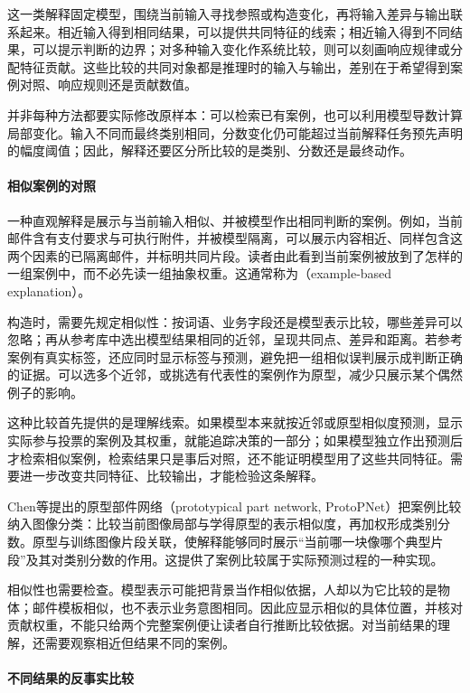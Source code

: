 这一类解释固定模型，围绕当前输入寻找参照或构造变化，再将输入差异与输出联系起来。相近输入得到相同结果，可以提供共同特征的线索；相近输入得到不同结果，可以提示判断的边界；对多种输入变化作系统比较，则可以刻画响应规律或分配特征贡献。这些比较的共同对象都是推理时的输入与输出，差别在于希望得到案例对照、响应规则还是贡献数值。

并非每种方法都要实际修改原样本：可以检索已有案例，也可以利用模型导数计算局部变化。输入不同而最终类别相同，分数变化仍可能超过当前解释任务预先声明的幅度阈值；因此，解释还要区分所比较的是类别、分数还是最终动作。

\paragraph{相似案例的对照}
\label{sec:interpretability-local-examples}

一种直观解释是展示与当前输入相似、并被模型作出相同判断的案例。例如，当前邮件含有支付要求与可执行附件，并被模型隔离，可以展示内容相近、同样包含这两个因素的已隔离邮件，并标明共同片段。读者由此看到当前案例被放到了怎样的一组案例中，而不必先读一组抽象权重。这通常称为（example-based explanation）。

构造时，需要先规定相似性：按词语、业务字段还是模型表示比较，哪些差异可以忽略；再从参考库中选出模型结果相同的近邻，呈现共同点、差异和距离。若参考案例有真实标签，还应同时显示标签与预测，避免把一组相似误判展示成判断正确的证据。可以选多个近邻，或挑选有代表性的案例作为原型，减少只展示某个偶然例子的影响。

这种比较首先提供的是理解线索。如果模型本来就按近邻或原型相似度预测，显示实际参与投票的案例及其权重，就能追踪决策的一部分；如果模型独立作出预测后才检索相似案例，检索结果只是事后对照，还不能证明模型用了这些共同特征。需要进一步改变共同特征、比较输出，才能检验这条解释。

Chen等提出的原型部件网络（prototypical part network, ProtoPNet）把案例比较纳入图像分类：比较当前图像局部与学得原型的表示相似度，再加权形成类别分数。原型与训练图像片段关联，使解释能够同时展示“当前哪一块像哪个典型片段”及其对类别分数的作用。这提供了案例比较属于实际预测过程的一种实现。

相似性也需要检查。模型表示可能把背景当作相似依据，人却以为它比较的是物体；邮件模板相似，也不表示业务意图相同。因此应显示相似的具体位置，并核对贡献权重，不能只给两个完整案例便让读者自行推断比较依据。对当前结果的理解，还需要观察相近但结果不同的案例。

\paragraph{不同结果的反事实比较}
\label{sec:interpretability-local-counterfactual}

